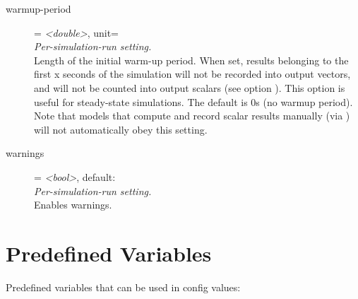 \begin{description}
\item[warmup-period] = \textit{<double>}, unit=\\
    \textit{Per-simulation-run setting.}\\
    Length of the initial warm-up period. When set, results belonging to the
    first x seconds of the simulation will not be recorded into output vectors,
    and will not be counted into output scalars (see option
    ).
    This option is useful for steady-state simulations. The default is 0s (no
    warmup period). Note that models that compute and record scalar results
    manually (via ) will not automatically obey this
    setting.
\item[warnings] = \textit{<bool>}, default: \\
    \textit{Per-simulation-run setting.}\\
    Enables warnings.
\end{description}

\section{Predefined Variables}
\label{sec:config-options:predefined-variables}

Predefined variables that can be used in config values:

